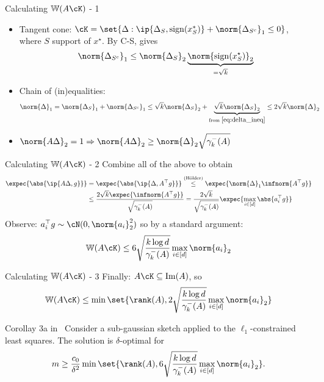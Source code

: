 \documentclass[10pt]{beamer}
\newcommand{\xstar}{x^{\star}}
\begin{document}
\begin{frame}{Calculating $\mathbb{W}(A \cK)$ - 1}
    \begin{itemize}
        \item
        Tangent cone: $\cK = \set{\Delta : \ip{\Delta_S,
        \mathrm{sign}(x^*_S)} + \norm{\Delta_{S^c}}_1 \leq 0}$,
        where $S$ support of $\xstar$. By C-S, gives
        \begin{equation}
            \norm{\Delta_{S^c}}_1 \leq \norm{\Delta_S}_2
            \underbrace{\norm{\mathrm{sign}(\xstar_S)}_2}_{= \sqrt{k}}
            \label{eq:delta_ineq}
        \end{equation}

        \item Chain of (in)equalities:
        \begin{align*}
            \norm{\Delta}_1 &= \norm{\Delta_S}_1 + \norm{\Delta_{S^c}}_1
            \leq \sqrt{k} \norm{\Delta_S}_2 +
            \underbrace{\sqrt{k} \norm{\Delta_{S}}_2}_{
                \text{from } \eqref{eq:delta_ineq}}
            \leq 2 \sqrt{k} \norm{\Delta}_2
        \end{align*}
        \item $\norm{A \Delta}_2 = 1 \Rightarrow
        \norm{A \Delta}_2 \geq \norm{\Delta}_2 \sqrt{\gamma_{k}^- (A)}$
    \end{itemize}
\end{frame}
\begin{frame}{Calculating $\mathbb{W}(A \cK)$ - 2}
    Combine all of the above to obtain
    \begin{align*}
        \expec{\abs{\ip{A \Delta, g}}} &= \expec{\abs{\ip{\Delta, A^\top g}}}
        \overset{(\text{H{\"o}lder})}{\leq}
        \expec{\norm{\Delta}_1
        \infnorm{A^\top g}} \\
        & \leq \frac{2 \sqrt{k} \expec{\infnorm{A^\top g}}}{
        \sqrt{\gamma_k^-(A)}} =
        \frac{2 \sqrt{k}}{\sqrt{\gamma_k^-(A)}}
        \expec{\max_{i \in [d]} \abs{a_i^\top g}}
    \end{align*}
    Observe: $a_i^\top g \sim \cN(0, \norm{a_i}_2^2)$ so by a standard argument:
    \[
        \mathbb{W}(A \cK) \leq 6 \sqrt{\frac{k \log d}{\gamma_k^-(A)}}
        \max_{i \in [d]} \norm{a_i}_2
    \]
\end{frame}

\begin{frame}{Calculating $\mathbb{W}(A \cK)$ - 3}
    Finally: $A \cK \subseteq \mathrm{Im}(A)$, so
    \[
        \mathbb{W}(A\cK) \leq \min\set{\rank(A),
        2 \sqrt{\frac{k \log d}{\gamma_k^-(A)}} \max_{i \in [d]} \norm{a_i}_2}
    \]
    \begin{block}{Corollay 3a in~\cite{PilWain15}}
        Consider a sub-gaussian sketch applied to the $\ell_1$-constrained
        least squares. The solution is $\delta$-optimal for
        \[
            m \geq \frac{c_0}{\delta^2} \min\set{\rank(A),
            6 \sqrt{\frac{k \log d}{\gamma_k^-(A)}} \max_{i \in [d]}
            \norm{a_i}_2}.
        \]
    \end{block}
\end{frame}


\end{document}
